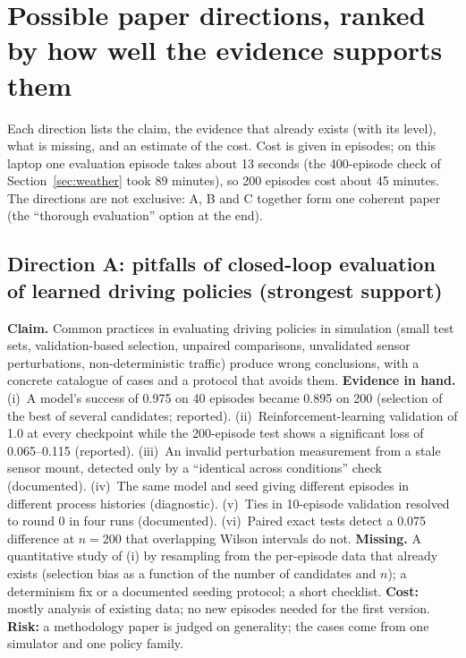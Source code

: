 \section{Possible paper directions, ranked by how well the evidence supports them}\label{sec:directions}

Each direction lists the claim, the evidence that already exists (with its level), what is missing, and an estimate of the cost. Cost is given in episodes; on this laptop one evaluation episode takes about 13 seconds (the 400-episode check of Section~\ref{sec:weather} took 89 minutes), so 200 episodes cost about 45 minutes.
The directions are not exclusive: A, B and C together form one coherent paper (the ``thorough evaluation'' option at the end).

\subsection{Direction A: pitfalls of closed-loop evaluation of learned driving policies (strongest support)}
\textbf{Claim.} Common practices in evaluating driving policies in simulation (small test sets, validation-based selection, unpaired comparisons, unvalidated sensor perturbations, non-deterministic traffic) produce wrong conclusions, with a concrete catalogue of cases and a protocol that avoids them.
\textbf{Evidence in hand.} (i)~A model's success of 0.975 on 40 episodes became 0.895 on 200 (selection of the best of several candidates; reported). (ii)~Reinforcement-learning validation of 1.0 at every checkpoint while the 200-episode test shows a significant loss of 0.065--0.115 (reported). (iii)~An invalid perturbation measurement from a stale sensor mount, detected only by a ``identical across conditions'' check (documented). (iv)~The same model and seed giving different episodes in different process histories (diagnostic).
(v)~Ties in 10-episode validation resolved to round 0 in four runs (documented). (vi)~Paired exact tests detect a 0.075 difference at $n=200$ that overlapping Wilson intervals do not.
\textbf{Missing.} A quantitative study of (i) by resampling from the per-episode data that already exists (selection bias as a function of the number of candidates and $n$); a determinism fix or a documented seeding protocol; a short checklist. \textbf{Cost:} mostly analysis of existing data; no new episodes needed for the first version.
\textbf{Risk:} a methodology paper is judged on generality; the cases come from one simulator and one policy family.

